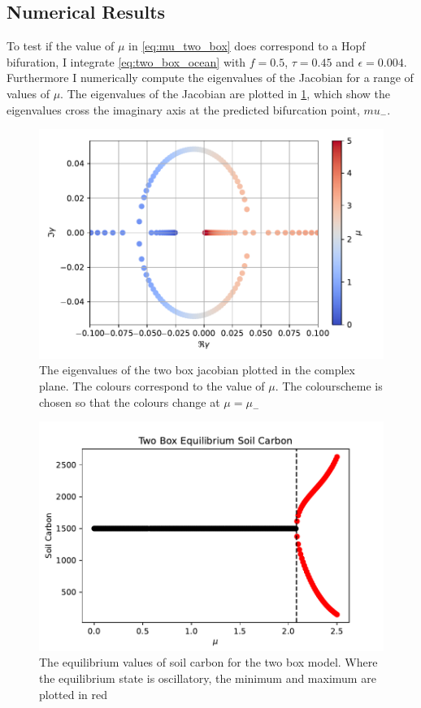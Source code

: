 \subsection{Numerical Results}
To test if the value of $\mu$ in \cref{eq:mu_two_box} does correspond to a Hopf bifuration, I integrate \cref{eq:two_box_ocean} with $f = 0.5$, $\tau = 0.45$ and $\epsilon = 0.004$.
Furthermore I numerically compute the eigenvalues of the Jacobian for a range of values of $\mu$. The eigenvalues of the Jacobian are plotted in \cref{fig:eigen_values_of_the_jacobian},
which show the eigenvalues cross the imaginary axis at the predicted bifurcation point, $mu_-$.
\begin{figure}
  \centering
  \includegraphics[width=\textwidth,keepaspectratio]{complex_plane_two_box_eig}
  \caption{The eigenvalues of the two box jacobian plotted in the complex plane. The colours correspond to the value of $\mu$. The colourscheme is chosen so that the colours change at $\mu = \mu_-$ }
  \label{fig:eigen_values_of_the_jacobian}
\end{figure}
\begin{figure}
  \centering
  \includegraphics[keepaspectratio,width=\textwidth]{two_box_model_soil_carbon_equilibrium}
  \caption{The equilibrium values of soil carbon for the two box model. Where the equilibrium state is oscillatory, the minimum and maximum are plotted in red}
  \label{fig:two_box_bf_diagram}
\end{figure}
